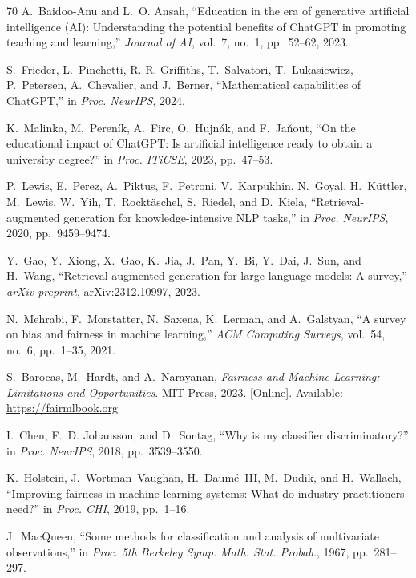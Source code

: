 \begin{thebibliography}{70}
A.~Baidoo-Anu and L.~O. Ansah,
``Education in the era of generative artificial intelligence (AI): Understanding the potential benefits of ChatGPT in promoting teaching and learning,''
\textit{Journal of AI}, vol.~7, no.~1, pp.~52--62, 2023.

S.~Frieder, L.~Pinchetti, R.-R. Griffiths, T.~Salvatori, T.~Lukasiewicz, P.~Petersen, A.~Chevalier, and J.~Berner,
``Mathematical capabilities of ChatGPT,''
in \textit{Proc. NeurIPS}, 2024.

K.~Malinka, M.~Peren{\'i}k, A.~Firc, O.~Hujn{\'a}k, and F.~Ja{\v{n}}out,
``On the educational impact of ChatGPT: Is artificial intelligence ready to obtain a university degree?''
in \textit{Proc. ITiCSE}, 2023, pp.~47--53.

P.~Lewis, E.~Perez, A.~Piktus, F.~Petroni, V.~Karpukhin, N.~Goyal, H.~K{\"{u}}ttler, M.~Lewis, W.~Yih, T.~Rockt{\"{a}}schel, S.~Riedel, and D.~Kiela,
``Retrieval-augmented generation for knowledge-intensive NLP tasks,''
in \textit{Proc. NeurIPS}, 2020, pp.~9459--9474.

Y.~Gao, Y.~Xiong, X.~Gao, K.~Jia, J.~Pan, Y.~Bi, Y.~Dai, J.~Sun, and H.~Wang,
``Retrieval-augmented generation for large language models: A survey,''
\textit{arXiv preprint}, arXiv:2312.10997, 2023.

N.~Mehrabi, F.~Morstatter, N.~Saxena, K.~Lerman, and A.~Galstyan,
``A survey on bias and fairness in machine learning,''
\textit{ACM Computing Surveys}, vol.~54, no.~6, pp.~1--35, 2021.

S.~Barocas, M.~Hardt, and A.~Narayanan,
\textit{Fairness and Machine Learning: Limitations and Opportunities}.
MIT Press, 2023.
[Online]. Available: \url{https://fairmlbook.org}

I.~Chen, F.~D. Johansson, and D.~Sontag,
``Why is my classifier discriminatory?''
in \textit{Proc. NeurIPS}, 2018, pp.~3539--3550.

K.~Holstein, J.~Wortman~Vaughan, H.~Daum{\'e}~III, M.~Dudik, and H.~Wallach,
``Improving fairness in machine learning systems: What do industry practitioners need?''
in \textit{Proc. CHI}, 2019, pp.~1--16.

J.~MacQueen,
``Some methods for classification and analysis of multivariate observations,''
in \textit{Proc. 5th Berkeley Symp. Math. Stat. Probab.}, 1967, pp.~281--297.


\end{thebibliography}
